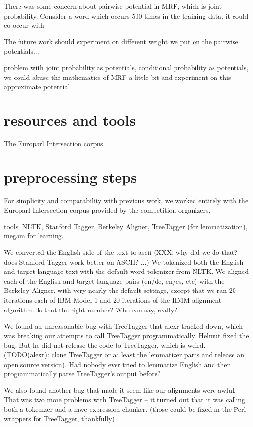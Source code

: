 \documentclass[11pt,letterpaper]{article}
\begin{document}
There was some concern about pairwise potential in MRF, which is joint probability. Consider a word which occurs 500 times in the training data, it could co-occur with

The future work should experiment on different weight we put on the pairwise potentials...

problem with joint probability as potentials, 
conditional probability as potentials, we could abuse the mathematics of MRF a little bit and experiment on this approximate potential.
\section{resources and tools}
The Europarl Intersection corpus.
	

\section{preprocessing steps}
For simplicity and comparability with previous work, we worked entirely with
the Europarl Intersection corpus provided by the competition organizers.


tools: NLTK, Stanford Tagger, Berkeley Aligner, TreeTagger (for lemmatization),
megam for learning.


We converted the English side of the text to ascii (XXX: why did we do that?
does Stanford Tagger work better on ASCII? ...) We tokenized both the English
and target language text with the default word tokenizer from NLTK.  We aligned
each of the English and target language pairs (en/de, en/es, etc) with the
Berkeley Aligner, with very nearly the default settings, except that we ran 20
iterations each of IBM Model 1 and 20 iterations of the HMM alignment
algorithm. Is that the right number? Who can say, really?


We found an unreasonable bug with TreeTagger that alexr tracked down, which was
breaking our attempts to call TreeTagger programmatically. Helmut fixed the
bug. But he did not release the code to TreeTagger, which is weird.
(TODO(alexr): clone TreeTagger or at least the lemmatizer parts and release an
open source version). Had nobody ever tried to lemmatize English and then
programmatically parse TreeTagger's output before?


We also found another bug that made it seem like our alignments were awful.
That was two more problems with TreeTagger -- it turned out that it was calling
both a tokenizer and a mwe-expression chunker. (those could be fixed in the
Perl wrappers for TreeTagger, thankfully)
\end{document}

